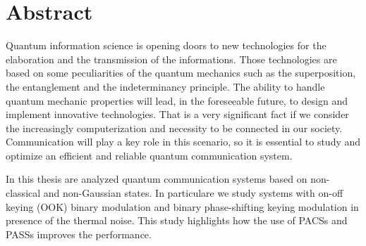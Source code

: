 
\chapter*{Abstract}
    Quantum information science is opening doors to new technologies for the elaboration and the transmission
    of the informations.
    Those technologies are based on some peculiarities of the quantum mechanics such as the superposition,
    the entanglement and the indeterminancy principle.
    The ability to handle quantum mechanic properties will lead, in the foreseeable future, to design
    and implement innovative technologies.
    That is a very significant fact if we consider the increasingly computerization and necessity to be
    connected in our society.
    Communication will play a key role in this scenario, so it is essential to study and optimize an
    efficient and reliable quantum communication system.

    In this thesis are analyzed quantum communication systems based on non-classical and non-Gaussian
    states. In particulare we study systems with on-off keying (OOK) binary modulation and binary
    phase-shifting keying modulation in presence of the thermal noise. This study highlights how the use 
    of PACSs and PASSs improves the performance.